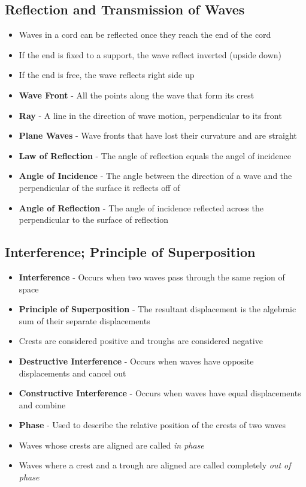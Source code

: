 \subsection{Reflection and Transmission of Waves}
\begin{itemize}
    \item Waves in a cord can be reflected once they reach the end of the cord
    \item If the end is fixed to a support, the wave reflect inverted (upside down)
    \item If the end is free, the wave reflects right side up
    \item \textbf{Wave Front} - All the points along the wave that form its crest
    \item \textbf{Ray} - A line in the direction of wave motion, perpendicular to its front
    \item \textbf{Plane Waves} - Wave fronts that have lost their curvature and are straight \item \textbf{Law of Reflection} - The angle of reflection equals the angel of incidence
    \item \textbf{Angle of Incidence} - The angle between the direction of a wave and the perpendicular of the surface it reflects off of
    \item \textbf{Angle of Reflection} - The angle of incidence reflected across the perpendicular to the surface of reflection
\end{itemize}

\subsection{Interference; Principle of Superposition}
\begin{itemize}
    \item \textbf{Interference} - Occurs when two waves pass through the same region of space
    \item \textbf{Principle of Superposition} - The resultant displacement is the algebraic sum of their separate displacements
    \item Crests are considered positive and troughs are considered negative
    \item \textbf{Destructive Interference} - Occurs when waves have opposite displacements and cancel out 
    \item \textbf{Constructive Interference} - Occurs when waves have equal displacements and combine
    \item \textbf{Phase} - Used to describe the relative position of the crests of two waves
    \item Waves whose crests are aligned are called \emph{in phase}
    \item Waves where a crest and a trough are aligned are called completely \emph{out of phase}
\end{itemize}

